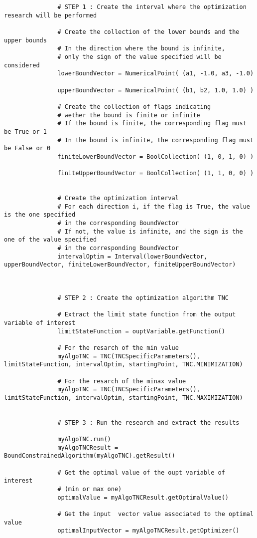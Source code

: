              \begin{lstlisting}
               # STEP 1 : Create the interval where the optimization research will be performed

               # Create the collection of the lower bounds and the upper bounds
               # In the direction where the bound is infinite,
               # only the sign of the value specified will be considered
               lowerBoundVector = NumericalPoint( (a1, -1.0, a3, -1.0)

               upperBoundVector = NumericalPoint( (b1, b2, 1.0, 1.0) )

               # Create the collection of flags indicating
               # wether the bound is finite or infinite
               # If the bound is finite, the corresponding flag must be True or 1
               # In the bound is infinite, the corresponding flag must be False or 0
               finiteLowerBoundVector = BoolCollection( (1, 0, 1, 0) )

               finiteUpperBoundVector = BoolCollection( (1, 1, 0, 0) )


               # Create the optimization interval
               # For each direction i, if the flag is True, the value is the one specified
               # in the corresponding BoundVector
               # If not, the value is infinite, and the sign is the one of the value specified
               # in the corresponding BoundVector
               intervalOptim = Interval(lowerBoundVector, upperBoundVector, finiteLowerBoundVector, finiteUpperBoundVector)



               # STEP 2 : Create the optimization algorithm TNC

               # Extract the limit state function from the output variable of interest
               limitStateFunction = ouptVariable.getFunction()

               # For the resarch of the min value
               myAlgoTNC = TNC(TNCSpecificParameters(), limitStateFunction, intervalOptim, startingPoint, TNC.MINIMIZATION)

               # For the resarch of the minax value
               myAlgoTNC = TNC(TNCSpecificParameters(), limitStateFunction, intervalOptim, startingPoint, TNC.MAXIMIZATION)


               # STEP 3 : Run the research and extract the results

               myAlgoTNC.run()
               myAlgoTNCResult = BoundConstrainedAlgorithm(myAlgoTNC).getResult()

               # Get the optimal value of the oupt variable of interest
               # (min or max one)
               optimalValue = myAlgoTNCResult.getOptimalValue()

               # Get the input  vector value associated to the optimal value
               optimalInputVector = myAlgoTNCResult.getOptimizer()
             \end{lstlisting}
